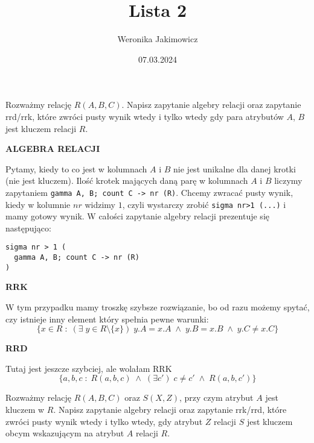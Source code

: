 \documentclass{article}
\title{Lista 2}
\author{Weronika Jakimowicz}
\date{07.03.2024}
\begin{document}
\maketitle

\begin{problem}
  Rozważmy relację $R(A, B, C)$. Napisz zapytanie algebry relacji oraz zapytanie rrd/rrk, które zwróci pusty wynik wtedy i tylko wtedy gdy para atrybutów $A$, $B$ jest kluczem relacji $R$.
\end{problem}

\begin{solution}
  \textbf{\color{green}ALGEBRA RELACJI}

  Pytamy, kiedy to co jest w kolumnach $A$ i $B$ nie jest unikalne dla danej krotki (nie jest kluczem). Ilość krotek mających daną parę w kolumnach $A$ i $B$ liczymy zapytaniem \lstinline{gamma A, B; count C -> nr (R)}. Chcemy zwracać pusty wynik, kiedy w kolumnie $nr$ widzimy $1$, czyli wystarczy zrobić \lstinline{sigma nr>1 (...)} i mamy gotowy wynik. W całości zapytanie algebry relacji prezentuje się następująco:
  \begin{lstlisting}
sigma nr > 1 (
  gamma A, B; count C -> nr (R)
)
  \end{lstlisting}

  \textbf{\color{green}RRK}
  
  W tym przypadku mamy troszkę szybsze rozwiązanie, bo od razu możemy spytać, czy istnieje inny element który spełnia pewne warunki:
  $$\{x\in R\;:\;(\exists\;y\in R\setminus\{x\})\;y.A=x.A\;\land\; y.B=x.B\;\land\;y.C\neq x.C\}$$
  
  \textbf{\color{green}RRD}
  
  Tutaj jest jeszcze szybciej, ale wolałam RRK
  $$\{a,b,c\;:\;R(a,b,c)\;\land\;(\exists c')\;c\neq c'\;\land\;R(a, b, c')\}$$
\end{solution}

\begin{problem}
  Rozważmy relację $R(A, B, C)$ oraz $S(X, Z)$, przy czym atrybut $A$ jest kluczem w $R$. Napisz zapytanie algebry relacji oraz zapytanie rrk/rrd, które zwróci pusty wynik wtedy i tylko wtedy, gdy atrybut $Z$ relacji $S$ jest kluczem obcym wskazującym na atrybut $A$ relacji $R$.
\end{problem}
\end{document}
